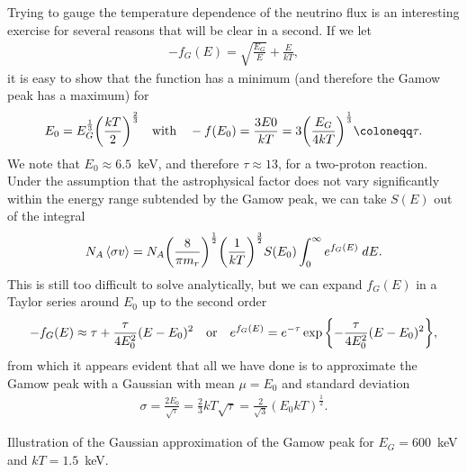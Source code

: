 Trying to gauge the temperature dependence of the neutrino flux is an interesting
exercise for several reasons that will be clear in a second. If we let
\begin{align*}
  -f_G(E) = \sqrt{\frac{E_G}{E}} + \frac{E}{kT},
\end{align*}
it is easy to show that the function has a minimum (and therefore the Gamow peak
has a maximum) for
\begin{align}
  E_0 = E_G^\frac{1}{3} \qty(\frac{kT}{2})^\frac{2}{3}
  \quad\text{with}\quad
  -f(E_0) = \frac{3E0}{kT} = 3 \qty(\frac{E_G}{4kT})^\frac{1}{3} \coloneqq \tau.
\end{align}
We note that $E_0 \approx 6.5$~keV, and therefore $\tau \approx 13$, for a two-proton reaction.
Under the assumption that the astrophysical factor does not vary significantly within
the energy range subtended by the Gamow peak, we can take $S(E)$ out of the integral
\begin{align*}
  N_A \left<\sigma v\right> = N_A \qty(\frac{8}{\pi m_r})^\frac{1}{2} \qty(\frac{1}{kT})^{\frac{3}{2}}
  S(E_0) \int_0^\infty e^{f_G(E)} \;d{E}.
\end{align*}
This is still too difficult to solve analytically, but we can expand $f_G(E)$ in a
Taylor series around $E_0$ up to the second order
\begin{align*}
  -f_G(E) \approx \tau + \frac{\tau}{4E_0^2} (E - E_0)^2
  \quad\text{or}\quad
  e^{f_G(E)} = e^{-\tau} \exp\qty{-\frac{\tau}{4E_0^2} (E - E_0)^2},
\end{align*}
from which it appears evident that all we have done is to approximate the Gamow
peak with a Gaussian with mean $\mu = E_0$ and standard deviation
\begin{align*}
  \sigma = \frac{2E_0}{\sqrt{\tau}} =
  \frac{2}{3} kT \sqrt{\tau} = \frac{2}{\sqrt{3}} (E_0 kT)^\frac{1}{2}.
\end{align*}

\begin{marginfigure}
  
  \caption{Illustration of the Gaussian approximation of the Gamow peak for
  $E_G = 600$~keV and $kT = 1.5$~keV.}
  \label{fig:gamow_peak_gaussian}
\end{marginfigure}


